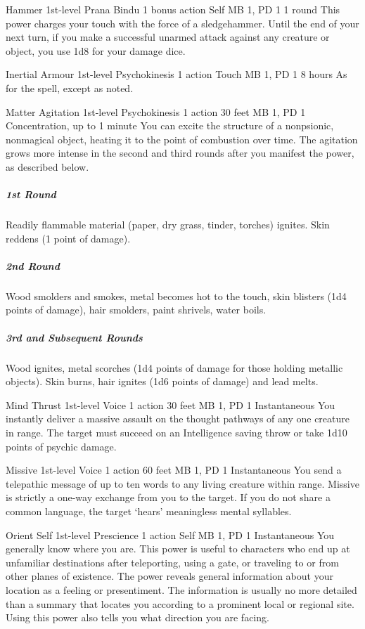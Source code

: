 \DndPowerHeader%
  {Hammer}
  {1st-level Prana Bindu}
  {1 bonus action}
  {Self}
  {MB 1, PD 1}
  {1 round}
This power charges your touch with the force of a sledgehammer.
Until the end of your next turn,
if you make a successful unarmed attack against any creature or object,
you use 1d8 for your damage dice.

\DndPowerHeader%
  {Inertial Armour}
  {1st-level Psychokinesis}
  {1 action}
  {Touch}
  {MB 1, PD 1}
  {8 hours}
As for the  spell, except as noted.

\DndPowerHeader%
  {Matter Agitation}
  {1st-level Psychokinesis}
  {1 action}
  {30 feet}
  {MB 1, PD 1}
  {Concentration, up to 1 minute}
  You can excite the structure of a nonpsionic,
  nonmagical object,
  heating it to the point of combustion over time.
  The agitation grows more intense in the second and third rounds
  after you manifest the power, as described below.

  \subparagraph{1st Round}
    Readily flammable material
    (paper, dry grass, tinder, torches) ignites.
    Skin reddens (1 point of damage).
  \subparagraph{2nd Round}
    Wood smolders and smokes,
    metal becomes hot to the touch,
    skin blisters (1d4 points of damage),
    hair smolders, paint shrivels, water boils.
  \subparagraph{3rd and Subsequent Rounds}
    Wood ignites, metal scorches
    (1d4 points of damage for those holding metallic objects).
    Skin burns, hair ignites (1d6 points of damage) and lead melts.

\DndPowerHeader%
  {Mind Thrust}
  {1st-level Voice}
  {1 action}
  {30 feet}
  {MB 1, PD 1}
  {Instantaneous}
You instantly deliver a massive assault on the thought pathways
of any one creature in range.
The target must succeed on an Intelligence saving throw
or take 1d10 points of psychic damage.

\DndPowerHeader%
  {Missive}
  {1st-level Voice}
  {1 action}
  {60 feet}
  {MB 1, PD 1}
  {Instantaneous}
  You send a telepathic message of up to ten words to
  any living creature within range.
  Missive is strictly a one-way exchange from you to the target.
  If you do not share a common language,
  the target `hears' meaningless mental syllables.

\DndPowerHeader%
  {Orient Self}
  {1st-level Prescience}
  {1 action}
  {Self}
  {MB 1, PD 1}
  {Instantaneous}
You generally know where you are.
This power is useful to characters who end up at unfamiliar destinations
after teleporting,
using a gate,
or traveling to or from other planes of existence.
The power reveals general information about your location
as a feeling or presentiment.
The information is usually no more detailed than a summary
that locates you according to a prominent local or regional site.
Using this power also tells you what direction you are facing.

